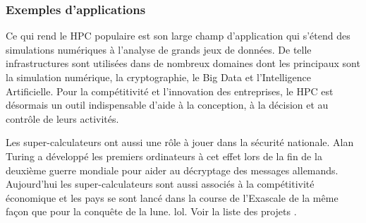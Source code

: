         \subsubsection{Exemples d'applications}

       
            Ce qui rend le HPC populaire est son large champ d’application qui s’étend des simulations numériques à l’analyse de grands jeux de données.  De telle infrastructures sont utilisées dans de nombreux domaines dont les principaux sont la simulation numérique, la cryptographie, le Big Data et l’Intelligence Artificielle. Pour la compétitivité et l'innovation des entreprises, le HPC est désormais un outil indispensable d'aide à la conception, à la décision et au contrôle de leurs activités.
            
            Les super-calculateurs ont aussi une rôle à jouer dans la sécurité nationale. Alan Turing a développé les premiers ordinateurs à cet effet lors de la fin de la deuxième guerre mondiale pour aider au décryptage des messages allemands. Aujourd’hui les super-calculateurs sont aussi associés à la compétitivité économique et les pays se sont lancé dans la course de l’Exascale de la même façon que pour la conquête de la lune. lol. Voir la liste des projets \cite{Reed2015}.







  
        
    
  
 







